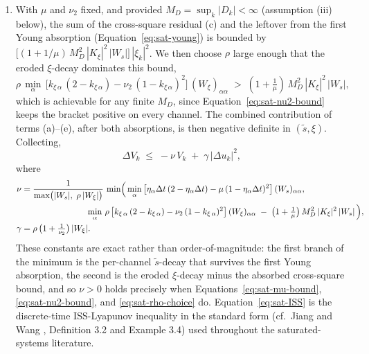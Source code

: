 \documentclass[conf]{new-aiaa}
\begin{document}
\begin{enumerate}
\item With $\mu$ and $\nu_2$ fixed, and provided $M_D = \sup_k |D_k| < \infty$ (assumption (iii) below), the sum of the cross-square residual (c) and the leftover from the first Young absorption (Equation~\ref{eq:sat-young}) is bounded by $\bigl[(1 + 1/\mu)\, M_D^2\, |K_\xi|^2\, |W_s|\bigr]\, |\xi_k|^2$. We then choose $\rho$ large enough that the eroded $\xi$-decay dominates this bound,
\begin{equation}
\label{eq:sat-rho-choice}
\rho\, \min_\alpha\, \bigl[ k_{\xi\,\alpha}\,(2 - k_{\xi\,\alpha}) - \nu_2\,(1-k_{\xi\,\alpha})^2 \bigr]\,(W_\xi)_{\alpha\alpha} \;>\; (1 + \tfrac{1}{\mu})\, M_D^2\, |K_\xi|^2\, |W_s|,
\end{equation}
which is achievable for any finite $M_D$, since Equation~\ref{eq:sat-nu2-bound} keeps the bracket positive on every channel. The combined contribution of terms (a)–(e), after both absorptions, is then negative definite in $(\tilde s, \xi)$. Collecting,
\begin{equation}
\label{eq:sat-ISS}
\Delta V_k \;\leq\; -\nu\, V_k \;+\; \gamma\, |\Delta u_k|^2,
\end{equation}
where
\small
\begin{align}
\label{eq:sat-nu-exact}
\nu &= \frac{1}{\max\bigl(|W_s|,\; \rho\, |W_\xi|\bigr)}\, \min\Bigl(\, \min_\alpha\, \bigl[ \eta_\alpha \Delta t\,(2 - \eta_\alpha \Delta t) - \mu\,(1-\eta_\alpha \Delta t)^2 \bigr]\,(W_s)_{\alpha\alpha}, \notag \\
&\hspace{7.6em} \min_\alpha\, \rho\,\bigl[ k_{\xi\,\alpha}\,(2 - k_{\xi\,\alpha}) - \nu_2\,(1-k_{\xi\,\alpha})^2 \bigr]\,(W_\xi)_{\alpha\alpha} \;-\; \bigl(1 + \tfrac{1}{\mu}\bigr)\, M_D^2\, |K_\xi|^2\, |W_s| \,\Bigr), \\
\label{eq:sat-gamma-exact}
\gamma &= \rho\,\bigl(1 + \tfrac{1}{\nu_2}\bigr)\, |W_\xi|.
\end{align}
\normalsize
These constants are exact rather than order-of-magnitude: the first branch of the minimum is the per-channel $\tilde s$-decay that survives the first Young absorption, the second is the eroded $\xi$-decay minus the absorbed cross-square bound, and so $\nu > 0$ holds precisely when Equations~\ref{eq:sat-mu-bound}, \ref{eq:sat-nu2-bound}, and \ref{eq:sat-rho-choice} do. Equation~\ref{eq:sat-ISS} is the discrete-time ISS-Lyapunov inequality in the standard form (cf.\ Jiang and Wang \cite{refs:JiangWang2001}, Definition 3.2 and Example 3.4) used throughout the saturated-systems literature.
\end{enumerate}
\end{document}
